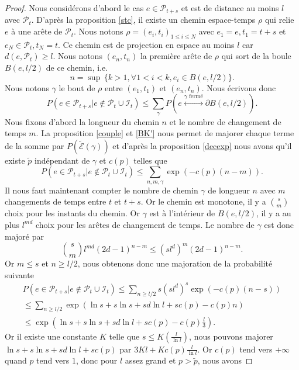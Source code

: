 \documentclass[titlepage,a4paper,12pt]{article}
\newcounter{th}
\newcounter{propo}
\begin{document}
\begin{proof}
Nous considérons d'abord le cas $e\in \mathcal{P}_{t+s}$ et est de distance au moins $l$ avec $\mathcal{P}_t$.
D'après la proposition \ref{stc}, il existe un chemin espace-temps $\rho$ qui relie $e$ à une arête de $\mathcal{P}_t$. Nous notons $\rho= (e_i,t_i)_{1\leqslant i \leqslant N}$ avec $e_1 = e, t_1 = t+s$ et $e_N\in \mathcal{P}_t, t_N = t$. Ce chemin est de projection en espace au moins $l$ car $d(e,\mathcal{P}_t)\geqslant l$. Nous notons $(e_n,t_n)$ la première arête de $\rho$ qui sort de la boule $B(e,l/2)$ de ce chemin, i.e. 
$$ n = \sup\,\big\{k>1, \forall 1<i<k, e_i\in B(e,l/2) \big\}.
$$
Nous notons $\gamma$ le bout de $\rho$ entre $(e_1,t_1)$ et $(e_n,t_n)$.
Nous écrivons donc 
$$ P(e\in \mathcal{P}_{t+s}|e\notin \mathcal{P}_t\cup \mathcal{I}_t) \leqslant \sum_{\gamma}P( e\overset{\gamma \text{ fermé}}{\longleftrightarrow} \partial B(e,l/2)).
$$
Nous fixons d'abord la longueur du chemin $n$ et le nombre de changement de temps $m$. La proposition \ref{couple} et \ref{BK'} nous permet de majorer chaque terme de la somme par $P(\tilde{\mathcal{E}}(\gamma))$ et d'après la proposition \ref{decexp} nous avons qu'il existe $\tilde{p}$ indépendant de $\gamma$ et $c(p)$ telles que 
$$P(e\in \mathcal{P}_{t+s}|e\notin \mathcal{P}_t\cup \mathcal{I}_t) \leqslant \sum_{n,m,\gamma} \exp(-c(p)(n-m)).
$$
Il nous faut maintenant compter le nombre de chemin $\gamma$ de longueur $n$ avec $m$ changements de temps entre $t$ et $t+s$. Or le chemin est monotone, il y a $\displaystyle s \choose m$ choix pour les instants du chemin. Or $\gamma$ est à l'intérieur de $B(e,l/2)$, il y a au plus $l^{md}$ choix pour les arêtes de changement de temps. Le nombre de $\gamma$ est donc majoré par
$$ {s\choose m} l^{md} (2d-1)^{n-m}\leqslant (sl^d)^m(2d-1)^{n-m}.
$$
Or $m\leqslant s$ et $n\geqslant l/2$, nous obtenons donc une majoration de la probabilité suivante
\begin{multline*}P(e\in \mathcal{P}_{t+s}|e\notin \mathcal{P}_t\cup \mathcal{I}_t) \leqslant \sum_{n\geqslant l/2}s(sl^d)^s\exp(-c(p)(n-s))\\\leqslant \sum_{n\geqslant l/2} \exp(\ln s+s\ln s+sd\ln l +sc(p)-c(p)n)
\\ \leqslant \exp(\ln s+s\ln s+sd\ln l +sc(p) -c(p)\frac{l}{3}).
\end{multline*}
Or il existe une constante $K$ telle que $\displaystyle s \leqslant K(\frac{l}{\ln l})$, nous pouvons majorer $\ln s+s\ln s+sd\ln l +sc(p)$ par $\displaystyle 3Kl+Kc(p)\frac{l}{\ln l}$. Or $c(p)$ tend vers $+\infty$ quand $p$ tend vers $1$, donc pour $l$ assez grand et $p>\tilde{p}$, nous avons 

\end{proof}
\end{document}
